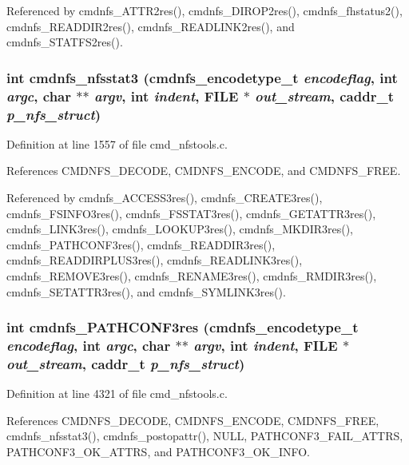 Referenced by cmdnfs\_\-ATTR2res(), cmdnfs\_\-DIROP2res(), cmdnfs\_\-fhstatus2(), cmdnfs\_\-READDIR2res(), cmdnfs\_\-READLINK2res(), and cmdnfs\_\-STATFS2res().
\subsubsection{\setlength{\rightskip}{0pt plus 5cm}int cmdnfs\_\-nfsstat3 ({\bf cmdnfs\_\-encodetype\_\-t} {\em encodeflag}, int {\em argc}, char $\ast$$\ast$ {\em argv}, int {\em indent}, FILE $\ast$ {\em out\_\-stream}, caddr\_\-t {\em p\_\-nfs\_\-struct})}\label{cmd__nfstools_8c_a81}




Definition at line 1557 of file cmd\_\-nfstools.c.

References CMDNFS\_\-DECODE, CMDNFS\_\-ENCODE, and CMDNFS\_\-FREE.

Referenced by cmdnfs\_\-ACCESS3res(), cmdnfs\_\-CREATE3res(), cmdnfs\_\-FSINFO3res(), cmdnfs\_\-FSSTAT3res(), cmdnfs\_\-GETATTR3res(), cmdnfs\_\-LINK3res(), cmdnfs\_\-LOOKUP3res(), cmdnfs\_\-MKDIR3res(), cmdnfs\_\-PATHCONF3res(), cmdnfs\_\-READDIR3res(), cmdnfs\_\-READDIRPLUS3res(), cmdnfs\_\-READLINK3res(), cmdnfs\_\-REMOVE3res(), cmdnfs\_\-RENAME3res(), cmdnfs\_\-RMDIR3res(), cmdnfs\_\-SETATTR3res(), and cmdnfs\_\-SYMLINK3res().
\subsubsection{\setlength{\rightskip}{0pt plus 5cm}int cmdnfs\_\-PATHCONF3res ({\bf cmdnfs\_\-encodetype\_\-t} {\em encodeflag}, int {\em argc}, char $\ast$$\ast$ {\em argv}, int {\em indent}, FILE $\ast$ {\em out\_\-stream}, caddr\_\-t {\em p\_\-nfs\_\-struct})}\label{cmd__nfstools_8c_a118}




Definition at line 4321 of file cmd\_\-nfstools.c.

References CMDNFS\_\-DECODE, CMDNFS\_\-ENCODE, CMDNFS\_\-FREE, cmdnfs\_\-nfsstat3(), cmdnfs\_\-postopattr(), NULL, PATHCONF3\_\-FAIL\_\-ATTRS, PATHCONF3\_\-OK\_\-ATTRS, and PATHCONF3\_\-OK\_\-INFO.
